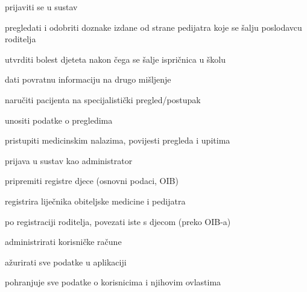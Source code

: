 \begin{packed_enum}
				\begin{packed_enum}
			
					\item prijaviti se u sustav
                    \item pregledati i odobriti doznake izdane od strane pedijatra koje se šalju poslodavcu roditelja
                    \item utvrditi bolest djeteta nakon čega se šalje ispričnica u školu
                    \item dati povratnu informaciju na drugo mišljenje
                    \item naručiti pacijenta na specijalistički pregled/postupak
                    \item unositi podatke o pregledima
                    \item pristupiti medicinskim nalazima, povijesti pregleda i upitima 
                    
				\end{packed_enum}
    
                \item  {}
				
				\begin{packed_enum}

                    \item prijava u sustav kao administrator
					\item pripremiti registre djece (osnovni podaci, OIB)
                    \item registrira liječnika obiteljske medicine i pedijatra
                    \item po registraciji roditelja, povezati iste s djecom (preko OIB-a)
					\item administrirati korisničke račune
                    \item ažurirati sve podatke u aplikaciji
                 
				\end{packed_enum}

                \item  {}
				
				\begin{packed_enum}

                    \item pohranjuje sve podatke o korisnicima i njihovim ovlastima
					
				\end{packed_enum}
    
			\end{packed_enum}
			
